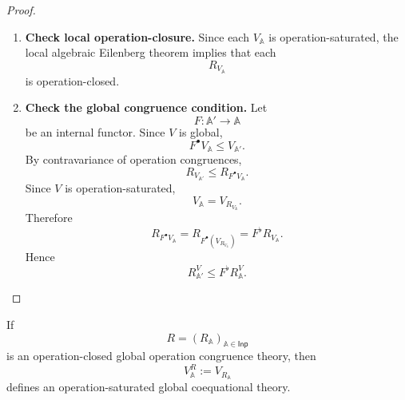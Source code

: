\begin{proof}
    \leavevmode
    \begin{enumerate}
        \item \textbf{Check local operation-closure.}
        Since each \(V_{\mathbb A}\) is operation-saturated, the local
        algebraic Eilenberg theorem implies that each
        \[
            R_{V_{\mathbb A}}
        \]
        is operation-closed.

        \item \textbf{Check the global congruence condition.}
        Let
        \[
            F:\mathbb A'\to\mathbb A
        \]
        be an internal functor. Since \(V\) is global,
        \[
            F^\bullet V_{\mathbb A}\leq V_{\mathbb A'}.
        \]
        By contravariance of operation congruences,
        \[
            R_{V_{\mathbb A'}}
            \leq
            R_{F^\bullet V_{\mathbb A}}.
        \]
        Since \(V\) is operation-saturated,
        \[
            V_{\mathbb A}=V_{R_{V_{\mathbb A}}}.
        \]
        Therefore
        \[
            R_{F^\bullet V_{\mathbb A}}
            =
            R_{F^\bullet(V_{R_{V_{\mathbb A}}})}
            =
            F^\flat R_{V_{\mathbb A}}.
        \]
        Hence
        \[
            R^V_{\mathbb A'}\leq F^\flat R^V_{\mathbb A}.
        \]
    \end{enumerate}
\end{proof}

\begin{proposition}
\label{prop:closed-global-congruences-to-saturated-global-theories}
    If
    \[
        R=(R_{\mathbb A})_{\mathbb A\in\mathsf{Inp}}
    \]
    is an operation-closed global operation congruence theory, then
    \[
        V^R_{\mathbb A}:=V_{R_{\mathbb A}}
    \]
    defines an operation-saturated global coequational theory.
\end{proposition}

